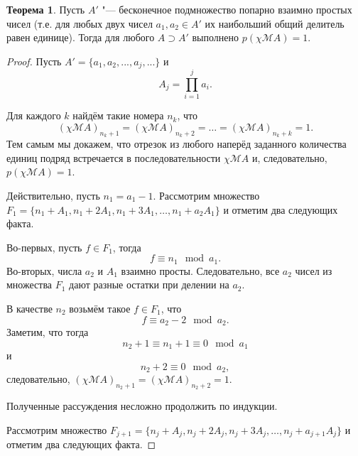 \documentclass[a4paper,openbib]{article}
\theoremstyle{definition}
\newtheorem{theorem}[lemma]{Теорема}
\begin{document}
\begin{theorem}
	\label{lem:ac0_primes_infinity_mutually_prime_subset}
	Пусть $A'$ "--- бесконечное подмножество попарно взаимно простых чисел
	(т.е. для любых двух чисел $a_1, a_2 \in A'$ их наибольший общий делитель равен единице).
	Тогда для любого $A \supset A' $ выполнено $p(\chi\mathscr{M}A)=1$.
\end{theorem}
\begin{proof}
	Пусть $A' = \{ a_1, a_2, ..., a_j, ... \}$ и
	\begin{equation}
		\label{eq:ac0_primes_A_j_prod_des}
		A_j = \prod_{i=1}^j a_i
		.
	\end{equation}

	Для каждого $k$ найдём такие номера $n_k$, что
	\begin{equation}
		(\chi\mathscr{M}A)_{n_k+1} = (\chi\mathscr{M}A)_{n_k+2} = \dots = (\chi\mathscr{M}A)_{n_k+k} = 1
		.
	\end{equation}
	Тем самым мы докажем, что отрезок из любого наперёд заданного количества единиц подряд
	встречается в последовательности $\chi\mathscr{M}A$ и, следовательно, $p(\chi\mathscr{M}A) = 1$.

	Действительно,
	пусть $n_1 = a_1 - 1$.
	Рассмотрим множество  $F_1 = \{ n_1 + A_1, n_1 + 2A_1, n_1 + 3A_1, \dots, n_1 + a_2A_1 \}$
	и отметим два следующих факта.

	Во-первых, пусть $f \in F_1$,
	тогда
	\begin{equation}
		f \equiv n_1 \mod a_1
		.
	\end{equation}
	Во-вторых, числа $a_2$ и $A_1$ взаимно просты.
	Следовательно, все $a_2$ чисел из множества $F_1$ дают разные остатки при делении на $a_2$.

	В качестве $n_2$ возьмём такое $f\in F_1$, что
	\begin{equation}
		f \equiv a_2 - 2 \mod a_2
		.
	\end{equation}
	Заметим, что тогда
	\begin{equation}
		n_2 + 1 \equiv n_1 + 1 \equiv 0 \mod a_1
	\end{equation}
	и
	\begin{equation}
		n_2 + 2 \equiv 0 \mod a_2
		,
	\end{equation}
	следовательно,
	$(\chi\mathscr{M}A)_{n_2 + 1} = (\chi\mathscr{M}A)_{n_2 + 2} = 1$.

	Полученные рассуждения несложно продолжить по индукции.

	Рассмотрим множество  $F_{j+1} = \{ n_j + A_j, n_j + 2A_j, n_j + 3A_j, \dots, n_j + a_{j+1}A_j \}$
	и отметим два следующих факта.


\end{proof}
\end{document}
